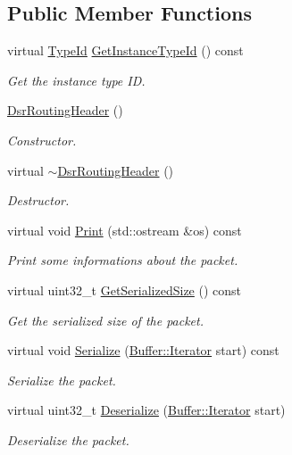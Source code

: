 \subsection*{Public Member Functions}
\begin{DoxyCompactItemize}
\item 
virtual \hyperlink{classns3_1_1TypeId}{Type\+Id} \hyperlink{classns3_1_1dsr_1_1DsrRoutingHeader_a569184eecafb9d14f569f1ae78592376}{Get\+Instance\+Type\+Id} () const 
\begin{DoxyCompactList}\small\item\em Get the instance type ID. \end{DoxyCompactList}\item 
\hyperlink{classns3_1_1dsr_1_1DsrRoutingHeader_a52331bb32744f1fa7e9e36b4f1bb661c}{Dsr\+Routing\+Header} ()
\begin{DoxyCompactList}\small\item\em Constructor. \end{DoxyCompactList}\item 
virtual \hyperlink{classns3_1_1dsr_1_1DsrRoutingHeader_a3f4f6d1a84b78f25119fa71badea6569}{$\sim$\+Dsr\+Routing\+Header} ()
\begin{DoxyCompactList}\small\item\em Destructor. \end{DoxyCompactList}\item 
virtual void \hyperlink{classns3_1_1dsr_1_1DsrRoutingHeader_ae4ecc439ba7136ce4f4cbb07353ad7cc}{Print} (std\+::ostream \&os) const 
\begin{DoxyCompactList}\small\item\em Print some informations about the packet. \end{DoxyCompactList}\item 
virtual uint32\+\_\+t \hyperlink{classns3_1_1dsr_1_1DsrRoutingHeader_a652e3ee1f4ecbe29aac2b5e3f7d81820}{Get\+Serialized\+Size} () const 
\begin{DoxyCompactList}\small\item\em Get the serialized size of the packet. \end{DoxyCompactList}\item 
virtual void \hyperlink{classns3_1_1dsr_1_1DsrRoutingHeader_aab7d92809ad6ad560f4297653e7ae2cc}{Serialize} (\hyperlink{classns3_1_1Buffer_1_1Iterator}{Buffer\+::\+Iterator} start) const 
\begin{DoxyCompactList}\small\item\em Serialize the packet. \end{DoxyCompactList}\item 
virtual uint32\+\_\+t \hyperlink{classns3_1_1dsr_1_1DsrRoutingHeader_aa3440ffd0d425f8562e313aea165c433}{Deserialize} (\hyperlink{classns3_1_1Buffer_1_1Iterator}{Buffer\+::\+Iterator} start)
\begin{DoxyCompactList}\small\item\em Deserialize the packet. \end{DoxyCompactList}\end{DoxyCompactItemize}
